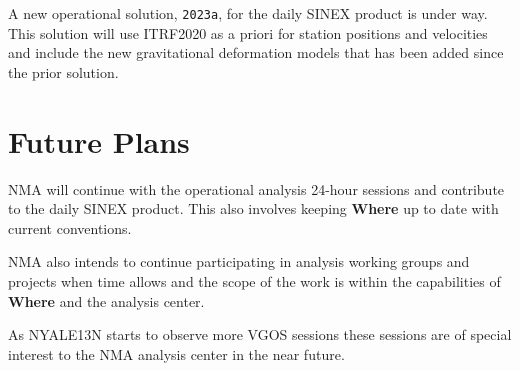 \documentclass[twocolumn,twoside]{svmultivs_br} %
\begin{document}
A new operational solution, \texttt{2023a}, for the daily SINEX product is under way. This solution
will use ITRF2020 as a priori for station positions and velocities and include the new gravitational deformation models
that has been added since the prior solution.
%
\section{Future Plans}
%
NMA will continue with the operational analysis 24-hour sessions and contribute to the daily SINEX product. 
This also involves keeping \textbf{Where} up to date with current conventions. 

NMA also intends to continue participating in analysis working groups and projects when time allows and the scope of
 the work is within the capabilities of \textbf{Where} and the analysis center. 

As NYALE13N starts to observe more VGOS sessions these sessions are of special interest to the NMA analysis center
in the near future.
%
%
                  
\end{document}
